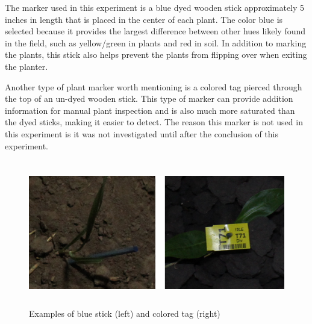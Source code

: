 The marker used in this experiment is a blue dyed wooden stick approximately 5 inches in length that is placed in the center of each plant. The color blue is selected because it provides the largest difference between other hues likely found in the field, such as yellow/green in plants and red in soil.  In addition to marking the plants, this stick also helps prevent the plants from flipping over when exiting the planter.

Another type of plant marker worth mentioning is a colored tag pierced through the top of an un-dyed wooden stick.  This type of marker can provide addition information for manual plant inspection and is also much more saturated than the dyed sticks, making it easier to detect.  The reason this marker is not used in this experiment is it was not investigated until after the conclusion of this experiment.

\begin{figure}[htb]
	\centering
    \includegraphics[height=2.5in]{figures/plant_markers.png}
    \caption[Plant markers]{Examples of blue stick (left) and colored tag (right)}
    \label{figure:plant_markers}
\end{figure}

